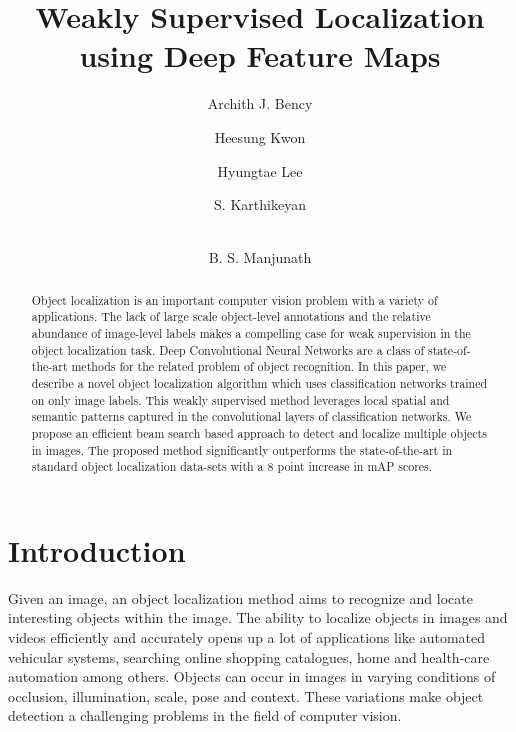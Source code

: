 \documentclass[runningheads]{llncs}
\begin{document}
\pagestyle{headings}
\mainmatter

\title{Weakly Supervised Localization using Deep Feature Maps} 




\author{Archith J. Bency  \and Heesung Kwon  \and Hyungtae Lee  \and S. Karthikeyan  \and \\ B. S. Manjunath }

\maketitle

\begin{abstract}
   Object localization is an important computer vision problem with a variety of applications. The lack of large scale object-level annotations and the relative abundance of image-level labels makes a compelling case for weak supervision in the object localization task. Deep Convolutional Neural Networks are a class of state-of-the-art methods for the related problem of object recognition. In this paper, we describe a novel object localization algorithm  which uses classification networks trained on only image labels. This weakly supervised method leverages local spatial and semantic patterns captured in the convolutional layers of classification networks. We propose an efficient beam search based approach to detect and localize multiple objects in images. The proposed method significantly outperforms the state-of-the-art in standard object localization data-sets with a 8 point increase in mAP scores.

\end{abstract}



\section{Introduction}
Given an image, an object localization method aims to recognize and locate interesting objects within the image. The ability to localize objects in images and videos efficiently and accurately opens up a lot of applications like automated vehicular systems, searching online shopping catalogues, home and health-care automation among others. Objects can occur in images in varying conditions of occlusion, illumination, scale, pose and context. These variations make object detection a challenging problems in the field of computer vision.
\end{document}
